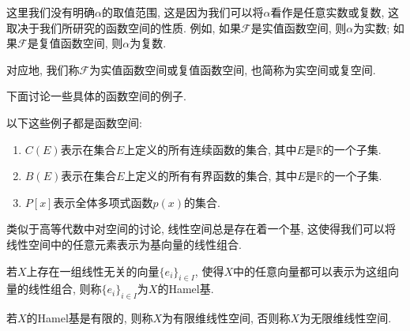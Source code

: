 \documentclass[theorem=false,mathfont=none,openany,sub3section]{easybook}
\begin{document}
\begin{remark}
  这里我们没有明确$\alpha$的取值范围, 这是因为我们可以将$\alpha$看作是任意实数或复数, 这取决于我们所研究的函数空间的性质. 例如, 如果$\mathcal{F}$是实值函数空间, 则$\alpha$为实数; 如果$\mathcal{F}$是复值函数空间, 则$\alpha$为复数.\par
  对应地, 我们称$\mathcal{F}$为实值函数空间或复值函数空间, 也简称为实空间或复空间.\par
\end{remark}

下面讨论一些具体的函数空间的例子.\par

\begin{example}
  以下这些例子都是函数空间:\par
  \begin{enumerate}
    \item $C(E)$表示在集合$E$上定义的所有连续函数的集合, 其中$E$是$\mathbb{R}$的一个子集.\par
    \item $B(E)$表示在集合$E$上定义的所有有界函数的集合, 其中$E$是$\mathbb{R}$的一个子集.\par
    \item $P[x]$表示全体多项式函数$p(x)$的集合.\par
  \end{enumerate}
\end{example}

类似于高等代数中对空间的讨论, 线性空间总是存在着一个基, 这使得我们可以将线性空间中的任意元素表示为基向量的线性组合.\par

\begin{definition}
  若$X$上存在一组线性无关的向量$\{e_i\}_{i \in I}$, 使得$X$中的任意向量都可以表示为这组向量的线性组合, 则称$\{e_i\}_{i \in I}$为$X$的Hamel基.\par
  若$X$的Hamel基是有限的, 则称$X$为有限维线性空间, 否则称$X$为无限维线性空间.\par
\end{definition}





\backmatter
\end{document}
